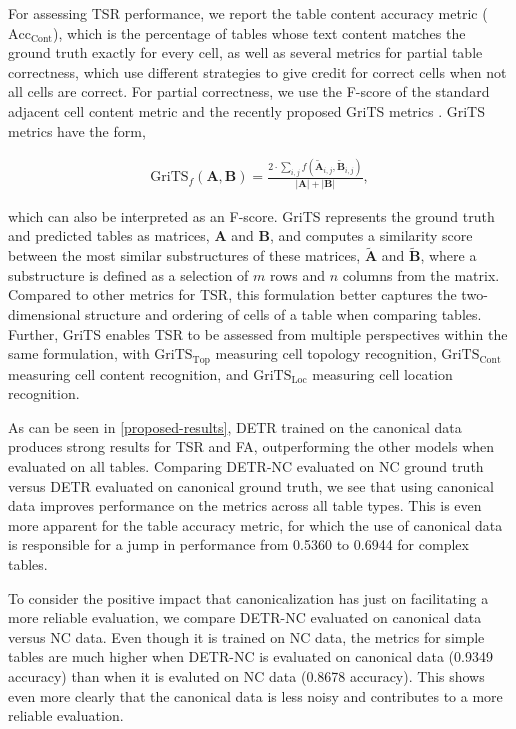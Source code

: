 \documentclass[10pt,twocolumn,letterpaper]{article}
\begin{document}
For assessing TSR performance, we report the table content accuracy metric ($\textrm{Acc}_\textrm{Cont}$), which is the percentage of tables whose text content matches the ground truth exactly for every cell, as well as several metrics for partial table correctness, which use different strategies to give credit for correct cells when not all cells are correct.
For partial correctness, we use the F-score of the standard adjacent cell content metric \cite{gobel2012methodology} and the recently proposed GriTS metrics \cite{smock2021grits}.
GriTS metrics have the form,

\begin{align}
\label{eq:grits}
\mathrm{GriTS}_f(\mathbf{A}, \mathbf{B}) = \frac{2 \cdot \sum_{i,j} f(\mathbf{\tilde{A}}_{i,j}, \mathbf{\tilde{B}}_{i,j})} {{|\mathbf{A}|} + {|\mathbf{B}|}},
\end{align}

\noindent which can also be interpreted as an F-score.
GriTS represents the ground truth and predicted tables as matrices, $\mathbf{A}$ and $\mathbf{B}$, and computes a similarity score between the most similar substructures \cite{amir2008generalized} of these matrices, $\mathbf{\tilde{A}}$ and $\mathbf{\tilde{B}}$, where a substructure is defined as a selection of $m$ rows and $n$ columns from the matrix.
Compared to other metrics for TSR, this formulation better captures the two-dimensional structure and ordering of cells of a table when comparing tables.
Further, GriTS enables TSR to be assessed from multiple perspectives within the same formulation, with $\textrm{GriTS}_\textrm{Top}$ measuring cell topology recognition, $\textrm{GriTS}_\textrm{Cont}$ measuring cell content recognition, and $\textrm{GriTS}_\textrm{Loc}$ measuring cell location recognition.

As can be seen in \cref{proposed-results}, DETR trained on the canonical data produces strong results for TSR and FA, outperforming the other models when evaluated on all tables.
Comparing DETR-NC evaluated on NC ground truth versus DETR evaluated on canonical ground truth, we see that using canonical data improves performance on the metrics across all table types.
This is even more apparent for the table accuracy metric, for which the use of canonical data is responsible for a jump in performance from 0.5360 to 0.6944 for complex tables.

To consider the positive impact that canonicalization has just on facilitating a more reliable evaluation, we compare DETR-NC evaluated on canonical data versus NC data.
Even though it is trained on NC data, the metrics for simple tables are much higher when DETR-NC is evaluated on canonical data (0.9349 accuracy) than when it is evaluted on NC data (0.8678 accuracy).
This shows even more clearly that the canonical data is less noisy and contributes to a more reliable evaluation.
\end{document}
